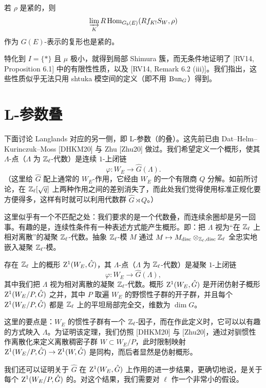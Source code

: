 若 $\rho$ 是紧的，则
\[
\varinjlim_K R\operatorname{Hom}_{G_b(E)}(Rf_{K!}S_W,\rho)
\]
作为 $G(E)$-表示的复形也是紧的。

特化到 $I=\{*\}$ 且 $\mu$ 极小，就得到局部 Shimura 簇，而无条件地证明了 [RV14, Proposition 6.1] 中的有限性性质，以及 [RV14, Remark 6.2 (iii)]。我们指出，这些性质似乎无法只用 shtuka 模空间的定义（即不用 $\mathrm{Bun}_G$）得到。

\section{L-参数叠}

下面讨论 Langlands 对应的另一侧，即 L-参数（的叠）。这先前已由 Dat–Helm–Kurinczuk–Moss [DHKM20] 与 Zhu [Zhu20] 做过。我们希望定义一个概形，使其 $\Lambda$-点（$\Lambda$ 为 $\mathbb{Z}_\ell$-代数）是连续 $1$-上闭链
\[
\varphi:W_E\longrightarrow\hat G(\Lambda).
\]
（这里给 $\hat G$ 配上通常的 $W_E$-作用，它经由 $W_E$ 的一个有限商 $Q$ 分解。如前所讨论，在 $\mathbb{Z}_\ell[\sqrt q]$ 上两种作用之间的差别消失了，而此处我们觉得使用标准正规化要方便得多，这样有时就可以利用代数群 $\hat G\rtimes Q$。）

这里似乎有一个不匹配之处：我们要求的是一个代数叠，而连续余圈却是另一回事。有趣的是，连续性条件有一种表述方式能产生概形。即：把 $\Lambda$ 视为“在 $\mathbb{Z}_\ell$ 上相对离散”的凝聚 $\mathbb{Z}_\ell$-代数。抽象 $\mathbb{Z}_\ell$-模 $M$ 通过 $M\mapsto M_{\mathrm{disc}}\otimes_{\mathbb{Z}_\ell,\mathrm{disc}}\mathbb{Z}_\ell$ 全忠实地嵌入凝聚 $\mathbb{Z}_\ell$-模。

\begin{theorem}%
存在 $\mathbb{Z}_\ell$ 上的概形 $\mathrm{Z}^1(W_E,\hat G)$，其 $\Lambda$-点（$\Lambda$ 为 $\mathbb{Z}_\ell$-代数）是凝聚 $1$-上闭链
\[
\varphi:W_E\longrightarrow\hat G(\Lambda),
\]
其中我们把 $\Lambda$ 视为相对离散的凝聚 $\mathbb{Z}_\ell$-代数。概形 $\mathrm{Z}^1(W_E,\hat G)$ 是开闭仿射子概形 $\mathrm{Z}^1(W_E/P,\hat G)$ 之并，其中 $P$ 取遍 $W_E$ 的野惯性子群的开子群，并且每个 $\mathrm{Z}^1(W_E/P,\hat G)$ 都是 $\mathbb{Z}_\ell$ 上的平坦局部完全交，维数为 $\dim G$。
\end{theorem}

这里的要点是：$W_E$ 的惯性子群有一个 $\mathbb{Z}_\ell$-因子，而在作此定义时，它可以以有趣的方式映入 $\Lambda$。为证明该定理，我们仿照 [DHKM20] 与 [Zhu20]，通过对驯惯性作离散化来定义离散稠密子群 $W\subset W_E/P$，此时限制映射 $\mathrm{Z}^1(W_E/P,\hat G)\to\mathrm{Z}^1(W,\hat G)$ 是同构，而后者显然是仿射概形。

我们还可以证明关于 $\hat G$ 在 $\mathrm{Z}^1(W_E,\hat G)$ 上作用的进一步结果，更确切地说，是关于每个 $\mathrm{Z}^1(W_E/P,\hat G)$ 的。对这个结果，我们需要对 $\ell$ 作一个非常小的假设。

